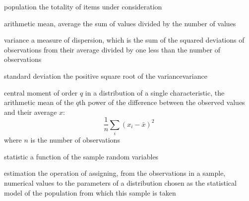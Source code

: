 \documentclass[avery5371,grid]{flashcards}
\begin{document}
\begin{flashcard}[Definition]{population}
\vspace{\fill}
    the totality of items under consideration
\vspace{\fill}
\end{flashcard}

\begin{flashcard}[Definition]{arithmetic mean, average}
\vspace{\fill}
    the sum of values divided by the number of values
\vspace{\fill}
\end{flashcard}

\begin{flashcard}[Definition]{variance}
\vspace{\fill}
    a measure of dispersion, which is the sum of the squared deviations of observations from their average divided by one less than the number of observations
\vspace{\fill}
\end{flashcard}

\begin{flashcard}[Definition]{standard deviation}
\vspace{\fill}
    the positive square root of the variancevariance
\vspace{\fill}
\end{flashcard}

\begin{flashcard}[Definition]{central moment of order $q$}
\vspace{\fill}
    in a distribution of a single characteristic,
        the arithmetic mean of the $q$th power of the difference between the observed values and their average $x$:
    \begin{equation*}
        \frac{1}{n} \sum_{i} \left( x_i - \bar{x} \right)^2
    \end{equation*}
    where $n$ is the number of observations
\vspace{\fill}
\end{flashcard}

\begin{flashcard}[Definition]{statistic}
\vspace{\fill}
    a function of the sample random variables
\vspace{\fill}
\end{flashcard}

\begin{flashcard}[Definition]{estimation}
\vspace{\fill}
    the operation of assigning, from the observations in a sample,
        numerical values to the parameters of a distribution chosen as the statistical model of the population from which this sample is taken
\vspace{\fill}
\end{flashcard}
\end{document}
